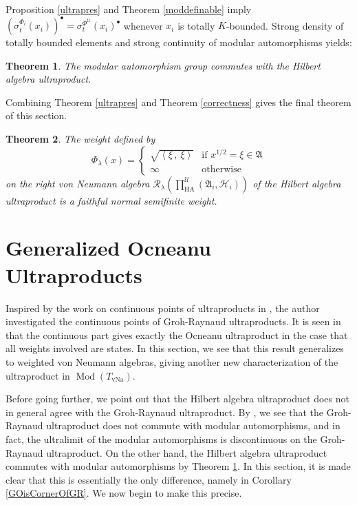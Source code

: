 \documentclass[12pt]{amsart}
\newtheorem{thm}{Theorem}[section]
\theoremstyle{definition}
\def\cal{\mathcal}
\def \Md{\operatorname{Mod}}
\DeclareMathOperator{\vNa}{vNa}
\newcommand\ip[2]{\left\langle #1\, ,\!\ #2 \right\rangle}
\newcommand\cU{{\cal U}}
\newcommand\R{{\cal R}}
\def \HA{\operatorname{HA}}
\begin{document}
Proposition \ref{ultrapres} and Theorem \ref{moddefinable} imply $(\sigma_t^{\Phi_i}(x_i))^\bullet = \sigma_t^{\Phi^{\cU}}(x_i)^\bullet$ whenever $x_i$ is totally $K$-bounded.  Strong density of totally bounded elements and strong continuity of modular automorphisms yields:

\begin{thm}\label{ultramod}
    The modular automorphism group commutes with the Hilbert algebra ultraproduct.
\end{thm}

Combining Theorem \ref{ultrapres} and Theorem \ref{correctness} gives the final theorem of this section.

\begin{thm}\label{HAWeight}
    The weight defined by
    \[
    \Phi_{\lambda}(x) = \begin{cases} 
      \sqrt{\ip{\xi}{\xi}} & \text{if } x^{1/2} = \xi \in \mathfrak{A} \\
      \infty & \text{otherwise}
    \end{cases}
    \]
    on the right von Neumann algebra $\R_{\lambda}(\prod_{\HA}^{\cU} (\mathfrak{A}_i, \cal H_i))$ of the Hilbert algebra ultraproduct is a faithful normal semifinite weight.
\end{thm}

\section{Generalized Ocneanu Ultraproducts}\label{SectionOcneanu}

Inspired by the work on continuous points of ultraproducts in \cite{BYG}, the author investigated the continuous points of Groh-Raynaud ultraproducts.  It is seen in \cite[Theorem 1.5]{MT} that the continuous part gives exactly the Ocneanu ultraproduct in the case that all weights involved are states.  In this section, we see that this result generalizes to weighted von Neumann algebras, giving another new characterization of the ultraproduct in $\Md(T_{\vNa})$.

Before going further, we point out that the Hilbert algebra ultraproduct does not in general agree with the Groh-Raynaud ultraproduct.  By \cite[Example 4.7]{AH}, we see that the Groh-Raynaud ultraproduct does not commute with modular automorphisms, and in fact, the ultralimit of the modular automorphisms is discontinuous on the Groh-Raynaud ultraproduct.  On the other hand, the Hilbert algebra ultraproduct commutes with modular automorphisms by Theorem \ref{ultramod}.  In this section, it is made clear that this is essentially the only difference, namely in Corollary \ref{GOisCornerOfGR}.  We now begin to make this precise.
\end{document}
